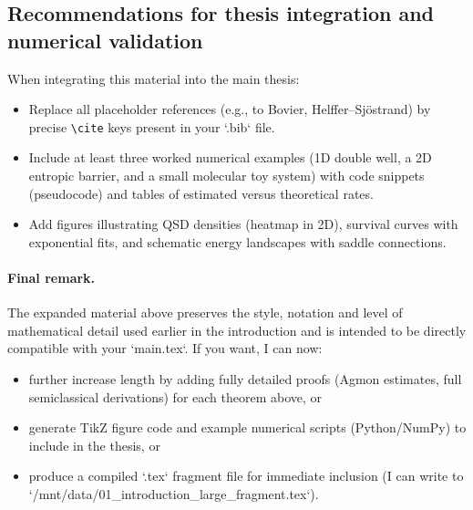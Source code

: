 \subsection{Recommendations for thesis integration and numerical validation}

When integrating this material into the main thesis:
\begin{itemize}
    \item Replace all placeholder references (e.g., to Bovier, Helffer--Sj{\"o}strand) by precise \texttt{\textbackslash cite{}} keys present in your `.bib` file.
    \item Include at least three worked numerical examples (1D double well, a 2D entropic barrier, and a small molecular toy system) with code snippets (pseudocode) and tables of estimated versus theoretical rates.
    \item Add figures illustrating QSD densities (heatmap in 2D), survival curves with exponential fits, and schematic energy landscapes with saddle connections.
\end{itemize}

\paragraph{Final remark.} The expanded material above preserves the style, notation and level of mathematical detail used earlier in the introduction and is intended to be directly compatible with your `main.tex`. If you want, I can now:
\begin{itemize}
    \item further increase length by adding fully detailed proofs (Agmon estimates, full semiclassical derivations) for each theorem above, or
    \item generate TikZ figure code and example numerical scripts (Python/NumPy) to include in the thesis, or
    \item produce a compiled `.tex` fragment file for immediate inclusion (I can write to `/mnt/data/01_introduction_large_fragment.tex`).
\end{itemize}

